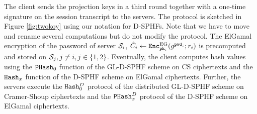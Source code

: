 The client sends the projection keys in a third round together with a one-time signature on the session transcript to the servers.
The protocol is sketched in Figure \ref{fig:twokoy} using our notation for \acp{D-SPHF}.
Note that we have to move and rename several computations but do not modify the protocol.
The ElGamal encryption of the password of server $\mathcal{S}_i$, $\hat{C}_{i}\gets\mathtt{Enc}^\mathrm{EG}_{\mathtt{pk}_i}(g^{\mathtt{pwd}_i};r_i)$ is precomputed and stored on $\mathcal{S}_{j},j\not=i,j\in\{1,2\}$.
Eventually, the client computes hash values using the $\mathtt{PHash}_0$ function of the GL-\ac{D-SPHF} scheme on CS ciphertexts and the $\mathtt{Hash}_x$ function of the \ac{D-SPHF} scheme on ElGamal ciphertexts.
Further, the servers execute the $\mathtt{Hash}_0^D$ protocol of the distributed GL-\ac{D-SPHF} scheme on Cramer-Shoup ciphertexts and the $\mathtt{PHash}_x^D$ protocol of the \ac{D-SPHF} scheme on ElGamal ciphertexts.

